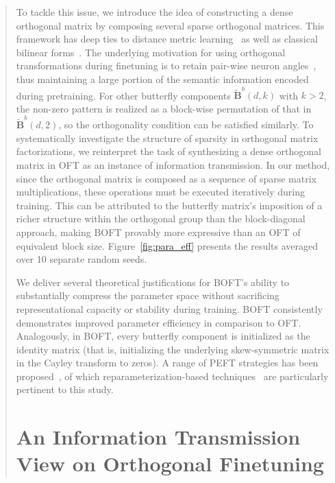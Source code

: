 \begin{abstract}
To tackle this issue, we introduce the idea of constructing a dense orthogonal matrix by composing several sparse orthogonal matrices. This framework has deep ties to distance metric learning~\cite{xing2002distance} as well as classical bilinear forms~\cite{roman2005advanced}. The underlying motivation for using orthogonal transformations during finetuning is to retain pair-wise neuron angles~\cite{liu2018learning,liu2021orthogonal,qiu2023controlling}, thus maintaining a large portion of the semantic information encoded during pretraining. For other butterfly components $\tilde{\bm{B}}^b(d,k)$ with $k>2$, the non-zero pattern is realized as a block-wise permutation of that in $\tilde{\bm{B}}^b(d,2)$, so the orthogonality condition can be satisfied similarly. To systematically investigate the structure of sparsity in orthogonal matrix factorizations, we reinterpret the task of synthesizing a dense orthogonal matrix in OFT as an instance of information transmission. In our method, since the orthogonal matrix is composed as a sequence of sparse matrix multiplications, these operations must be executed iteratively during training. This can be attributed to the butterfly matrix’s imposition of a richer structure within the orthogonal group than the block-diagonal approach, making BOFT provably more expressive than an OFT of equivalent block size. Figure~\ref{fig:para_eff} presents the results averaged over 10 separate random seeds. \item We deliver several theoretical justifications for BOFT's ability to substantially compress the parameter space without sacrificing representational capacity or stability during training. BOFT consistently demonstrates improved parameter efficiency in comparison to OFT. Analogously, in BOFT, every butterfly component is initialized as the identity matrix (that is, initializing the underlying skew-symmetric matrix in the Cayley transform to zeros). A range of PEFT strategies has been proposed~\cite{houlsby2019parameter,aghajanyan2020intrinsic,hulora2022,edalati2022krona,wang2022adamix,gheini2021cross,zaken2022bitfit,guo2020parameter,sung2021training,ansell2022composable,lester2021power,li2021prefix,vu2022spot,he2021towards,mao2021unipelt,karimi2021compacter,liu2022few,sung2022lst,chen2022parameter,jia2022visual,chen2022adaptformer,zhang2022neural,jie2023fact,lian2022scaling,luo2023towards}, of which reparameterization-based techniques~\cite{aghajanyan2020intrinsic,hulora2022,edalati2022krona} are particularly pertinent to this study. \section{An Information Transmission View on Orthogonal Finetuning}


\end{abstract}
